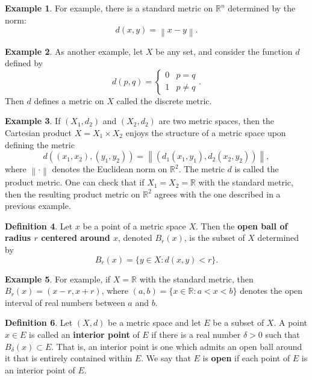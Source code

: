 \documentclass[12pt]{article}
\newcommand{\norm}[1]{\left\lVert#1\right\rVert}
\theoremstyle{definition}
\newtheorem{definition}{Definition}
\newtheorem{example}[definition]{Example}
\theoremstyle{theorem}
\begin{document}
\begin{example}
For example, there is a standard metric on $\mathbb{R}^n$ determined by the norm: 
\[
d(x,y) = \norm{x - y}.
\]
\end{example}

\begin{example}
As another example, let $X$ be any set, and consider the function $d$ defined by 
\[
d(p,q) = \begin{cases}
0 & p =q \\
1 & p \ne q
\end{cases}.
\]
Then $d$ defines a metric on $X$ called the discrete metric. 
\end{example}

\begin{example}
If $(X_1,d_2)$ and $(X_2,d_2)$ are two metric spaces, then the Cartesian product $X = X_1 \times X_2$ enjoys the structure of a metric space upon defining the metric 
\[
d((x_1, x_2), (y_1, y_2)) = \norm{\left(d_1(x_1, y_1), d_2(x_2, y_2)\right)},
\]
where $\norm{\cdot}$ denotes the Euclidean norm on $\mathbb{R}^2$. The metric $d$ is called the product metric. One can check that if $X_1 = X_2 = \mathbb{R}$ with the standard metric, then the resulting product metric on $\mathbb{R}^2$ agrees with the one described in a previous example. 
\end{example}

\begin{definition}
Let $x$ be a point of a metric space $X$. Then the \textbf{open ball of radius $r$ centered around $x$}, denoted $B_r(x)$, is the subset of $X$ determined by 
\[
B_r(x) = \{y \in X : d(x,y) < r\}.
\]
\end{definition}

\begin{example}
For example, if $X = \mathbb{R}$ with the standard metric, then $B_r(x) = (x-r, x+r)$, where $(a,b) = \{x \in \mathbb{R} : a < x < b\}$ denotes the open interval of real numbers between $a$ and $b$. 
\end{example}

\begin{definition}
Let $(X,d)$ be a metric space and let $E$ be a subset of $X$. A point $x \in E$ is called an \textbf{interior point} of $E$ if there is a real number $\delta > 0$ such that $B_\delta(x) \subset E$. That is, an interior point is one which admits an open ball around it that is entirely contained within $E$. We say that $E$ is \textbf{open} if each point of $E$ is an interior point of $E$. 
\end{definition}
\end{document}
